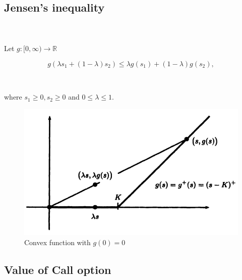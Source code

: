 \documentclass[c, dvipsnames, 8pt]{beamer}
\begin{document}
\subsection{Jensen's inequality }


\begin{frame}[shrink=5]
\frametitle{\insertsection} 
\framesubtitle{\insertsubsection} 

\

Let $g: [0, \infty) \to \mathbb{R}$

\begin{equation}\label{key}
g(\lambda s_1 + (1-\lambda) s_2) \leq   \lambda g( s_1)  + (1-\lambda) g(s_2), 
\end{equation}

\

where $ s_1 \geq 0, s_2 \geq 0$ and  $0\leq \lambda \leq 1$.


\begin{figure}
	\centering
	\includegraphics[width=0.8\linewidth]{screenshot004}
	\caption{Convex function with $g(0) = 0 $}
	\label{fig:screenshot004}
\end{figure}



\end{frame}	

\subsection{Value of Call option}
\end{document}
